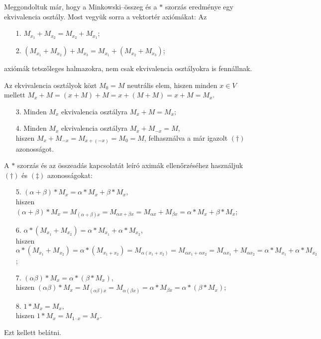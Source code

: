 \documentclass[a4paper, showtrims]{memoir}
\makeatletter
\renewenvironment{proof}[1][\proofname]
    {\par\pushQED{\qed}%
    \normalfont \topsep6\p@\@plus6\p@\relax
    \trivlist
    \item[\hskip\labelsep
        \itshape
    #1\@addpunct{:}]\ignorespaces}
    {\popQED\endtrivlist\@endpefalse}
\theoremstyle{plain}
\theoremstyle{remark}
\theoremstyle{definition}
\makeatother
\begin{document}
\begin{proof}
	Meggondoltuk már, hogy a Minkowski--összeg és a $\ast$ szorzás eredménye egy ekvivalencia osztály.
	Most vegyük sorra a vektortér axiómákat:
	Az
	\begin{enumerate}
		\item[1.] $M_{x_1}+M_{x_{2}}=M_{x_2}+M_{x_1}$;
		\item[2.] $\left( M_{x_1}+M_{x_2} \right)+M_{x_3}=
			      M_{x_1}+\left( M_{x_2}+M_{x_3} \right)$;
	\end{enumerate}
	axiómák tetszőleges halmazokra, nem csak ekvivalencia osztályokra is fennállnak.

	Az ekvivalencia osztályok közt $M_0=M$ neutrális elem,
	hiszen minden $x\in V$ mellett $M_x+M=\left( x+M \right)+M=x+\left( M+M \right)=x+M=M_x$.
	\begin{enumerate}
		\item[3.] Minden $M_x$ ekvivalencia osztályra $M_x+M=M_x$;
		\item[4.] Minden $M_x$ ekvivalencia osztályra $M_x+M_{-x}=M$,\\
		      hiszen
		      $M_x+M_{-x}=M_{x+\left( -x \right)}=M_0=M$,
		      felhasználva a már igazolt $(\dag)$ azonosságot.
	\end{enumerate}
	A $\ast$ szorzás és az összeadás kapcsolatát leíró aximák ellenőrzéséhez használjuk
	$(\dag)$ és $(\ddag)$ azonosságokat:
	\begin{enumerate}
		\item[5.] $\left( \alpha+\beta \right)\ast M_x=\alpha\ast M_x+\beta\ast M_x$,\\
		      hiszen
		      $\left( \alpha+\beta \right)\ast M_x
			      =
			      M_{\left( \alpha+\beta \right)x}
			      =
			      M_{\alpha x+\beta x}
			      =
			      M_{\alpha x}+M_{\beta x}
			      =
			      \alpha\ast M_x+\beta\ast M_x$;
		\item[6.] $\alpha\ast\left( M_{x_1}+M_{x_2} \right)
			      =
			      \alpha\ast M_{x_1}+\alpha\ast M_{x_2}$,\\
		      hiszen
		      $
			      \alpha\ast\left( M_{x_1}+M_{x_2} \right)
			      =
			      \alpha\ast\left( M_{x_1+x_2} \right)
			      =
			      M_{\alpha(x_1+x_2)}
			      =
			      M_{\alpha x_1+\alpha x_2}
			      =
			      M_{\alpha x_1}+M_{\alpha x_2}
			      =
			      \alpha\ast M_{x_1}+\alpha\ast M_{x_2}$;
		\item[7.] $
			      \left( \alpha\beta \right)\ast M_{x}=
			      \alpha\ast\left( \beta\ast M_{x} \right)$,\\
		      hiszen
		      $
			      \left( \alpha\beta \right)\ast M_{x}
			      =
			      M_{\left( \alpha\beta \right)x}
			      =
			      M_{\alpha\left( \beta x \right)}
			      =
			      \alpha\ast M_{\beta x}
			      =
			      \alpha\ast\left( \beta\ast M_x \right)
		      $;
		\item[8.]
		      $
			      1\ast M_{x}=M_{x},
		      $
		      \\hiszen
		      $
			      1\ast M_{x}=M_{1\cdot x}=M_x.
		      $
	\end{enumerate}
	Ezt kellett belátni.
\end{proof}
\end{document}
